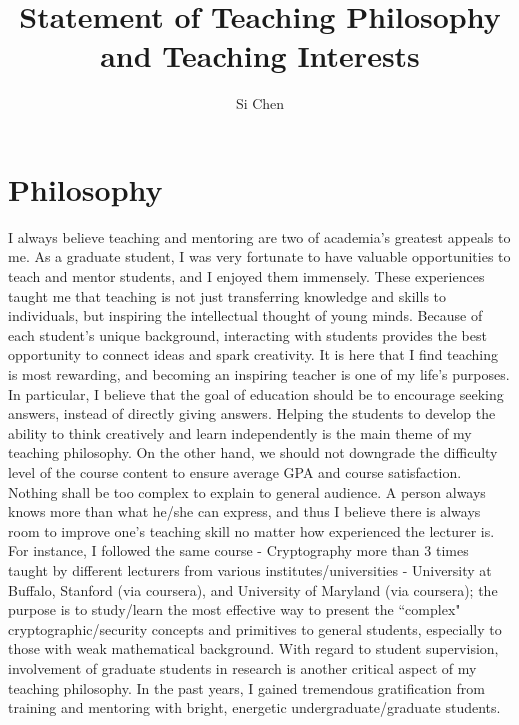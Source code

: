 \documentclass[11pt]{article}
\begin{document}
\title{Statement of Teaching Philosophy and Teaching Interests}
\author{Si Chen}
\date{}
\maketitle

\section*{Philosophy} 

I always believe teaching and mentoring are two of academia's greatest appeals to me. As a graduate student, I was very fortunate to have valuable opportunities to teach and mentor students, and I enjoyed them immensely. These experiences taught me that teaching is not just transferring knowledge and skills to individuals, but inspiring the intellectual thought of young minds. Because of each student's unique background, interacting with students provides the best opportunity to connect ideas and spark creativity. It is here that I find teaching is most rewarding, and becoming an inspiring teacher is one of my life's purposes. In particular, I believe that the goal of education should be to encourage seeking answers, instead of directly giving answers. Helping the students to develop the ability to think creatively and learn independently is the main theme of my teaching philosophy. On the other hand, we should not downgrade the difficulty level of the course content to ensure average GPA and course satisfaction. Nothing shall be too complex to explain to general audience. A person always knows more than what he/she can express, and thus I believe there is always room to improve one's teaching skill no matter how experienced the lecturer is. For instance, I followed the same course - Cryptography more than 3 times taught by different lecturers from various institutes/universities - University at Buffalo, Stanford (via coursera), and University of Maryland (via coursera); the purpose is to study/learn the most effective way to present the ``complex" cryptographic/security concepts and primitives to general students, especially to those with weak mathematical background. With regard to student supervision, involvement of graduate students in research is another critical aspect of my teaching philosophy. In the past years, I gained tremendous gratification from training and mentoring with bright, energetic undergraduate/graduate students. 
\end{document}
